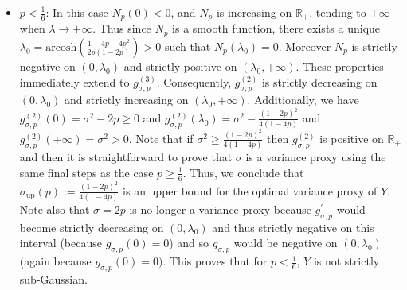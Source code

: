 \documentclass[a4paper, 10pt]{article}
\newcommand{\arcosh}{\text{arcosh}}
\theoremstyle{definition}
\begin{document}
\begin{itemize}
    \item $p<\frac{1}{6}$: In this case $N_{p}(0)<0$, and $N_{p}$ is increasing on $\mathbb{R}_+$, tending to $+\infty$ when $\lambda\to +\infty$. Thus since $N_{p}$ is a smooth function, there exists a unique $\lambda_0=\arcosh\left(\frac{1-4p-4p^2}{2p(1-2p)}\right)>0$ such that $N_{p}(\lambda_0)=0$. Moreover $N_{p}$ is strictly negative on $(0,\lambda_0)$ and strictly positive on $(\lambda_0,+\infty)$. These properties immediately extend to $g_{\sigma,p}^{(3)}$. Consequently, $g_{\sigma,p}^{(2)}$ is strictly decreasing on $(0,\lambda_0)$ and strictly increasing on $(\lambda_0,+\infty)$. Additionally, we have $g_{\sigma,p}^{(2)}(0)=\sigma^2-2p\geq 0$ and $g_{\sigma,p}^{(2)}(\lambda_0)=\sigma^2-\frac{(1-2p)^2}{4(1-4p)}$ and $g_{\sigma,p}^{(2)}(+\infty)=\sigma^2>0$. Note that if $\sigma^2\geq \frac{(1-2p)^2}{4(1-4p)}$ then $g^{(2)}_{\sigma,p}$ is positive on $\mathbb{R}_+$ and then it is straightforward to prove that $\sigma$ is a variance proxy using the same final steps as the case $p\geq\frac{1}{6}$. Thus, we conclude that $\sigma_{\text{up}}(p):=\frac{(1-2p)^2}{4(1-4p)}$ {is an upper bound for the optimal variance proxy of $Y$}. Note also that $\sigma=2p$ is no longer a variance proxy because $g^{'}_{\sigma,p}$ would become strictly decreasing on $(0,\lambda_0)$ and thus strictly negative on this interval (because $g^{'}_{\sigma,p}(0)=0$) and so $g_{\sigma,p}$ would be negative on $(0,\lambda_0)$ (again because $g_{\sigma,p}(0)=0)$. This proves that {for $p<\frac{1}{6}$, $Y$ is not strictly sub-Gaussian}. 
\end{itemize}
\end{document}
